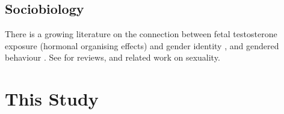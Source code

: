 \documentclass[a0,portrait]{a0poster}
\begin{document}
\begin{multicols}{2}
\subsection*{Sociobiology}

There is a growing literature on the connection between fetal testosterone exposure (hormonal organising effects) and gender identity \citep{hinesetal2004, berenbaumbailey2003}, and gendered behaviour \citep{hinesetal2002, auyeungetal2009}. See \citet{hines2006, balthazart2011} for reviews, and related work on sexuality.


%
%




\section*{This Study}


\end{multicols}
\end{document}
